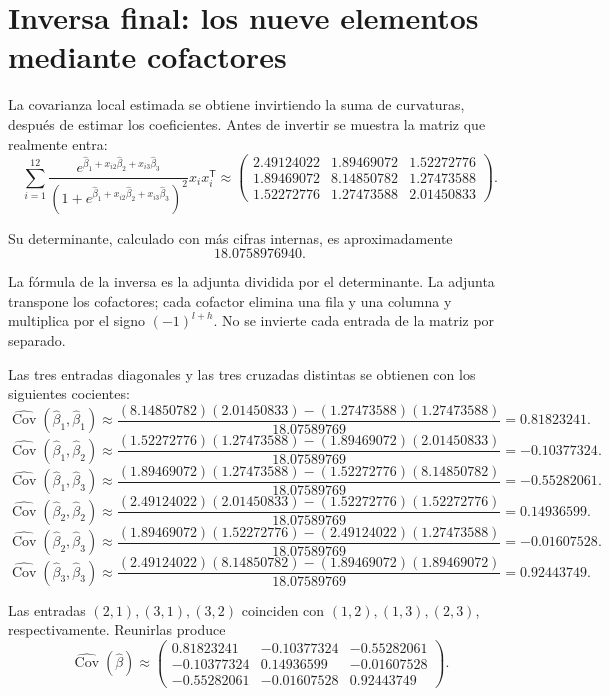 \documentclass[11pt,a4paper]{article}
\newcommand{\T}{^{\mathsf T}}
\DeclareMathOperator{\Cov}{Cov}
\begin{document}
\clearpage
\section{Inversa final: los nueve elementos mediante cofactores}\label{logit108}
La covarianza local estimada se obtiene invirtiendo la suma
de curvaturas, después de estimar los coeficientes.
Antes de invertir se muestra la matriz que realmente entra:
\[
\sum_{i=1}^{12}\frac{e^{\widehat\beta_1+x_{i2}\widehat\beta_2+x_{i3}\widehat\beta_3}}{(1+e^{\widehat\beta_1+x_{i2}\widehat\beta_2+x_{i3}\widehat\beta_3})^2}x_ix_i\T\approx\begin{pmatrix}2.49124022&1.89469072&1.52272776\\1.89469072&8.14850782&1.27473588\\1.52272776&1.27473588&2.01450833\end{pmatrix}.
\]

Su determinante, calculado con más cifras internas,
es aproximadamente
\[
18.0758976940.
\]

La fórmula de la inversa es la adjunta dividida por el
determinante. La adjunta transpone los cofactores;
cada cofactor elimina una fila y una columna y
multiplica por el signo \((-1)^{l+h}\).
No se invierte cada entrada de la matriz por separado.

Las tres entradas diagonales y las tres cruzadas distintas
se obtienen con los siguientes cocientes:
\[
\widehat{\Cov}(\widehat\beta_1,\widehat\beta_1)\approx\frac{(8.14850782)(2.01450833)-(1.27473588)(1.27473588)}{18.07589769}=0.81823241.
\]
\[
\widehat{\Cov}(\widehat\beta_1,\widehat\beta_2)\approx\frac{(1.52272776)(1.27473588)-(1.89469072)(2.01450833)}{18.07589769}=-0.10377324.
\]
\[
\widehat{\Cov}(\widehat\beta_1,\widehat\beta_3)\approx\frac{(1.89469072)(1.27473588)-(1.52272776)(8.14850782)}{18.07589769}=-0.55282061.
\]
\[
\widehat{\Cov}(\widehat\beta_2,\widehat\beta_2)\approx\frac{(2.49124022)(2.01450833)-(1.52272776)(1.52272776)}{18.07589769}=0.14936599.
\]
\[
\widehat{\Cov}(\widehat\beta_2,\widehat\beta_3)\approx\frac{(1.89469072)(1.52272776)-(2.49124022)(1.27473588)}{18.07589769}=-0.01607528.
\]
\[
\widehat{\Cov}(\widehat\beta_3,\widehat\beta_3)\approx\frac{(2.49124022)(8.14850782)-(1.89469072)(1.89469072)}{18.07589769}=0.92443749.
\]

Las entradas \((2,1),(3,1),(3,2)\) coinciden con
\((1,2),(1,3),(2,3)\), respectivamente.
Reunirlas produce
\[
\widehat{\Cov}(\widehat\beta)\approx\begin{pmatrix}0.81823241&-0.10377324&-0.55282061\\-0.10377324&0.14936599&-0.01607528\\-0.55282061&-0.01607528&0.92443749\end{pmatrix}.
\]
\end{document}
